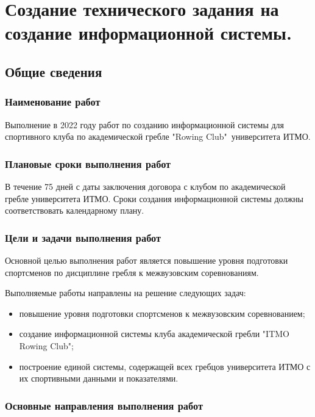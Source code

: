 \documentclass[14pt]{extreport}
\begin{document}
\chapter{Создание технического задания на создание информационной системы.}

\section{Общие сведения}

\subsection{Наименование работ}

Выполнение в 2022 году работ по созданию информационной системы для спортивного клуба по академической гребле "Rowing Club"\ университета ИТМО.

\subsection{Плановые сроки выполнения работ}

В течение 75 дней с даты заключения договора с клубом по академической гребле университета ИТМО. Сроки создания информационной системы должны соответствовать календарному плану.

\subsection{Цели и задачи выполнения работ}

Основной целью выполнения работ является повышение уровня подготовки спортсменов по дисциплине гребля к межвузовским соревнованиям.

Выполняемые работы направлены на решение следующих задач:

\begin{itemize}
\item повышение уровня подготовки спортсменов к межвузовским соревнованием;
\item создание информационной системы клуба академической гребли "ITMO Rowing Club";
\item построение единой системы, содержащей всех гребцов университета ИТМО с их спортивными данными и показателями.
\end{itemize}

\subsection{Основные направления выполнения работ}
\end{document}
